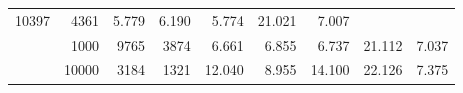 \begin{table}
\begin{tabular}{rrrrrrrrr}
							     10397  & 4361  
	                           & 5.779 & 6.190 & 5.774
	                           & 21.021 & 7.007  \\
	                
	            
					 &  
					 
					\multirow{ 1 }{*}{ 1000 } &
					
						
							    
							     9765  & 3874  
	                           & 6.661 & 6.855 & 6.737
	                           & 21.112 & 7.037  \\
	                
	            
					 &  
					 
					\multirow{ 1 }{*}{ 10000 } &
					
						
							    
							     3184  & 1321  
	                           & 12.040 & 8.955 & 14.100
	                           & 22.126 & 7.375  \\
	                
	            
	        

\hline

\end{tabular}
\end{table}
\clearpage


	    

